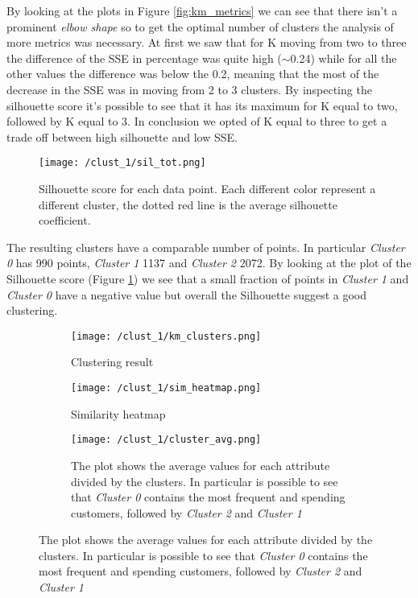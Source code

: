 \documentclass{article}
\begin{document}
By looking at the plots in Figure \ref{fig:km_metrics} we can see that there isn't a prominent \emph{elbow shape} so to get the optimal number of clusters the analysis of more metrics was necessary. At first we saw that for K moving from two to three the difference of the SSE in percentage was quite high ($\sim$0.24) while for all the other values the difference was below the 0.2, meaning that the most of the decrease in the SSE was in moving from 2 to 3 clusters. By inspecting the silhouette score it's possible to see that it has its maximum for K equal to two, followed by K equal to 3. In conclusion we opted of K equal to three to get a trade off between high silhouette and low SSE.

\begin{figure}[h!]
    \centering
    \texttt{[image: /clust\_1/sil\_tot.png]}
    \caption{Silhouette score for each data point. Each different color represent a different cluster, the dotted red line is the average silhouette coefficient.}
    \label{fig:silhouette}
\end{figure}

The resulting clusters have a comparable number of points. In particular \emph{Cluster 0} has 990 points, \emph{Cluster 1} 1137 and \emph{Cluster 2} 2072. By looking at the plot of the Silhouette score (Figure \ref{fig:silhouette}) we see that a small fraction of points in \emph{Cluster 1} and \emph{Cluster 0} have a negative value but overall the Silhouette suggest a good clustering.

\begin{figure}[h!]
    \centering
    \begin{subfigure}{0.49\textwidth}
        \texttt{[image: /clust\_1/km\_clusters.png]}
        \caption{Clustering result}
        \label{fig:skmclust}
    \end{subfigure}
    \begin{subfigure}{0.49\textwidth}
        \texttt{[image: /clust\_1/sim\_heatmap.png]}
        \caption{Similarity heatmap}
        \label{fig:sim_heatmap}
    \end{subfigure}
    
    \begin{subfigure}{0.49\textwidth}
        \texttt{[image: /clust\_1/cluster\_avg.png]}
        \caption{The plot shows the average values for each attribute divided by the clusters. In particular is possible to see that \emph{Cluster 0} contains the most frequent and spending customers, followed by \emph{Cluster 2} and \emph{Cluster 1}}
        \label{fig:km_avg}
    \end{subfigure}
\end{figure}
\end{document}
